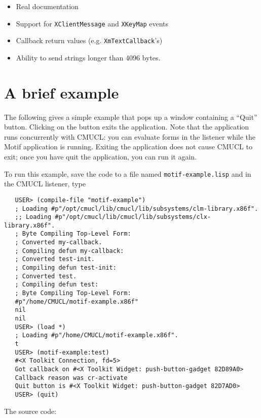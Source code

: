 \documentclass[a4paper]{article}
\begin{document}
\begin{itemize}
\item Real documentation
\item Support for \texttt{XClientMessage} and \texttt{XKeyMap} events
\item Callback return values (e.g. \texttt{XmTextCallback}'s)
\item Ability to send strings longer than 4096 bytes.
\end{itemize}



\section{A brief example}

The following gives a simple example that pops up a window containing
a ``Quit'' button. Clicking on the button exits the application. Note
that the application runs concurrently with CMUCL: you can
evaluate forms in the listener while the Motif application is running.
Exiting the application does not cause CMUCL to exit; once you have
quit the application, you can run it again.

To run this example, save the code to a file named
\verb|motif-example.lisp| and in the CMUCL listener, type

\begin{verbatim}
   USER> (compile-file "motif-example")
   ; Loading #p"/opt/cmucl/lib/cmucl/lib/subsystems/clm-library.x86f".
   ;; Loading #p"/opt/cmucl/lib/cmucl/lib/subsystems/clx-library.x86f".
   ; Byte Compiling Top-Level Form: 
   ; Converted my-callback.
   ; Compiling defun my-callback: 
   ; Converted test-init.
   ; Compiling defun test-init: 
   ; Converted test.
   ; Compiling defun test: 
   ; Byte Compiling Top-Level Form: 
   #p"/home/CMUCL/motif-example.x86f"
   nil
   nil
   USER> (load *)
   ; Loading #p"/home/CMUCL/motif-example.x86f".
   t
   USER> (motif-example:test)
   #<X Toolkit Connection, fd=5>
   Got callback on #<X Toolkit Widget: push-button-gadget 82D89A0>
   Callback reason was cr-activate
   Quit button is #<X Toolkit Widget: push-button-gadget 82D7AD0>
   USER> (quit)
\end{verbatim}

\newpage
The source code:
\end{document}
